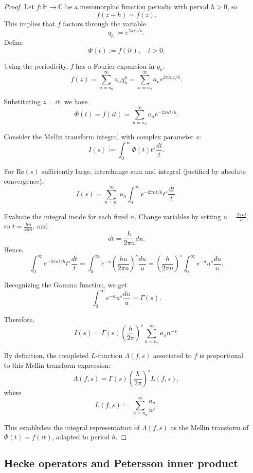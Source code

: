 \begin{proof}
    Let \(f: \mathbb{H} \to \mathbb{C}\) be a meromorphic function periodic with period \(h > 0\), so
    \[
    f(z+h) = f(z).
    \]
    This implies that \(f\) factors through the variable
    \[
    q_h := e^{2\pi i z / h}.
    \]
    Define
    \[
    \Phi(t) := f(i t), \quad t > 0.
    \]

    Using the periodicity, \(f\) has a Fourier expansion in \(q_h\):
    \[
    f(z) = \sum_{n=n_0}^\infty a_n q_h^n = \sum_{n=n_0}^\infty a_n e^{2 \pi i n z / h}.
    \]

    Substituting \(z = it\), we have
    \[
    \Phi(t) = f(i t) = \sum_{n=n_0}^\infty a_n e^{-2 \pi n t / h}.
    \]

    Consider the Mellin transform integral with complex parameter \(s\):
    \[
    I(s) := \int_0^\infty \Phi(t) t^{s} \frac{dt}{t}.
    \]

    For \(\mathrm{Re}(s)\) sufficiently large, interchange sum and integral (justified by absolute convergence):
    \[
    I(s) = \sum_{n=n_0}^\infty a_n \int_0^\infty e^{-2\pi n t / h} t^{s} \frac{dt}{t}.
    \]

    Evaluate the integral inside for each fixed \(n\). Change variables by setting \(u = \frac{2\pi n t}{h}\), so \(t = \frac{h u}{2 \pi n}\), and
    \[
    dt = \frac{h}{2 \pi n} du.
    \]
    Hence,
    \[
    \int_0^\infty e^{-2\pi n t / h} t^{s} \frac{dt}{t} = \int_0^\infty e^{-u} \left(\frac{h u}{2 \pi n}\right)^s \frac{du}{u} = \left(\frac{h}{2 \pi n}\right)^s \int_0^\infty e^{-u} u^{s} \frac{du}{u}.
    \]

    Recognizing the Gamma function, we get
    \[
    \int_0^\infty e^{-u} u^{s} \frac{du}{u} = \Gamma(s).
    \]

    Therefore,
    \[
    I(s) = \Gamma(s) \left(\frac{h}{2\pi}\right)^s \sum_{n=n_0}^\infty a_n n^{-s}.
    \]

    By definition, the completed \(L\)-function \(\Lambda(f,s)\) associated to \(f\) is proportional to this Mellin transform expression:
    \[
    \Lambda(f,s) = \Gamma(s) \left(\frac{h}{2\pi}\right)^s L(f,s),
    \]
    where
    \[
    L(f,s) := \sum_{n=n_0}^\infty \frac{a_n}{n^s}.
    \]

    This establishes the integral representation of \(\Lambda(f,s)\) as the Mellin transform of \(\Phi(t) = f(it)\), adapted to period \(h\).
\end{proof}


\subsection{Hecke operators and Petersson inner product}


